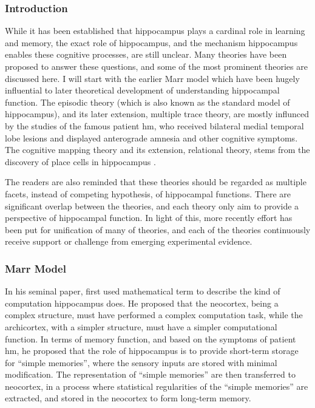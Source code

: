 \subsubsection{Introduction}
While it has been established that hippocampus plays a cardinal role in learning and memory, the exact role of hippocampus, and the mechanism hippocampus enables these cognitive processes, are still unclear. Many theories have been proposed to answer these questions, and some of the most prominent theories are discussed here. I will start with the earlier Marr model \citep{marr71} which have been hugely influential to later theoretical development of understanding hippocampal function. The episodic theory (which is also known as the standard model of hippocampus), and its later extension, multiple trace theory, are mostly influnced by the studies of the famous patient \gls{hm}, who received bilateral medial temporal lobe lesions and displayed anterograde amnesia and other cognitive symptoms. The cognitive mapping theory and its extension, relational theory, stems from the discovery of place cells in hippocampus \citep{o'keefe71}. 

The readers are also reminded that these theories should be regarded as multiple facets, instead of competing hypothesis, of hippocampal functions. There are significant overlap between the theories, and each theory only aim to provide a perspective of hippocampal function. In light of this, more recently effort has been put for unification of many of theories, and each of the theories continuously receive support or challenge from emerging experimental evidence.


\subsubsection{Marr Model}
In his seminal paper, \citet{marr71} first used mathematical term to describe the kind of computation hippocampus does. He proposed that the neocortex, being a complex structure, must have performed a complex computation task, while the archicortex, with a simpler structure, must have a simpler computational function. In terms of memory function, and based on the symptoms of patient \gls{hm}, he proposed that the role of hippocampus is to provide short-term storage for ``simple memories'', where the sensory inputs are stored with minimal modification. The representation of ``simple memories'' are then transferred to neocortex, in a process where statistical regularities of the ``simple memories'' are extracted, and stored in the neocortex to form long-term memory. 


